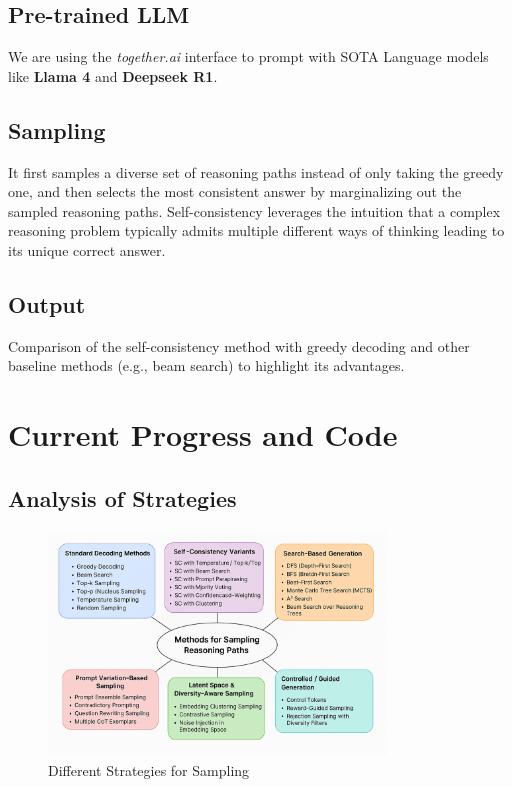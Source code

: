 \documentclass[24pt]{article}
\begin{document}
\subsection{Pre-trained LLM}
We are using the \textit{together.ai} interface to prompt with SOTA Language models like \textbf{Llama 4} and \textbf{Deepseek R1}. 

\subsection{Sampling}
It first samples a diverse set of reasoning paths instead of only taking the greedy one, and then selects the most consistent answer by marginalizing out the sampled reasoning paths. Self-consistency leverages the intuition that a complex reasoning problem typically admits multiple different ways of thinking leading to its unique correct answer.


\subsection{Output} Comparison of the self-consistency method with greedy decoding and other baseline methods (e.g., beam search) to highlight its advantages.


\section{Current Progress and Code}
\subsection{Analysis of Strategies}
\begin{figure}[h]
    \centering
    \includegraphics[width=0.8\textwidth]{diagram.png}
    \caption{Different Strategies for Sampling}
    \label{}
\end{figure}
    
\end{document}
